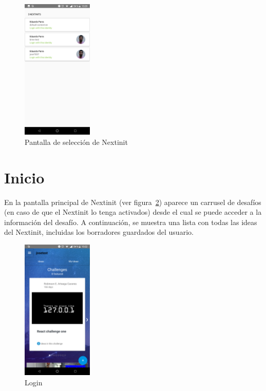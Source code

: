 \begin{figure}[!h]
	\begin{center}
		\includegraphics[width=0.3\textwidth]{./img/anexo1/seleccion_empresa.png}
		\caption{Pantalla de selección de Nextinit}
		\label{fig:seleccion_empresa}
	\end{center}
\end{figure}

\section{Inicio}
 
En la pantalla principal de Nextinit (ver figura~\ref{fig:inicio}) aparece un carrusel de desafíos 
(en caso de que el Nextinit lo tenga activados) desde el cual se puede acceder a la información 
del desafío. A continuación, se muestra una lista con todas las ideas del Nextinit, incluidas los 
borradores guardados del usuario.

\begin{figure}[!h]
	\begin{center}
		\includegraphics[width=0.3\textwidth]{./img/anexo1/inicio.png}
		\caption{Login}
		\label{fig:inicio}
	\end{center}
\end{figure}

